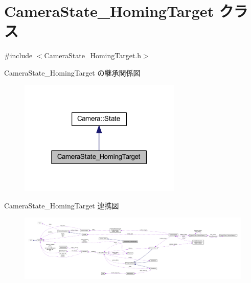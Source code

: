 \hypertarget{class_camera_state___homing_target}{}\section{Camera\+State\+\_\+\+Homing\+Target クラス}
\label{class_camera_state___homing_target}


{\ttfamily \#include $<$Camera\+State\+\_\+\+Homing\+Target.\+h$>$}



Camera\+State\+\_\+\+Homing\+Target の継承関係図\nopagebreak
\begin{figure}[H]
\begin{center}
\leavevmode
\includegraphics[width=219pt]{class_camera_state___homing_target__inherit__graph}
\end{center}
\end{figure}


Camera\+State\+\_\+\+Homing\+Target 連携図\nopagebreak
\begin{figure}[H]
\begin{center}
\leavevmode
\includegraphics[width=350pt]{class_camera_state___homing_target__coll__graph}
\end{center}
\end{figure}
